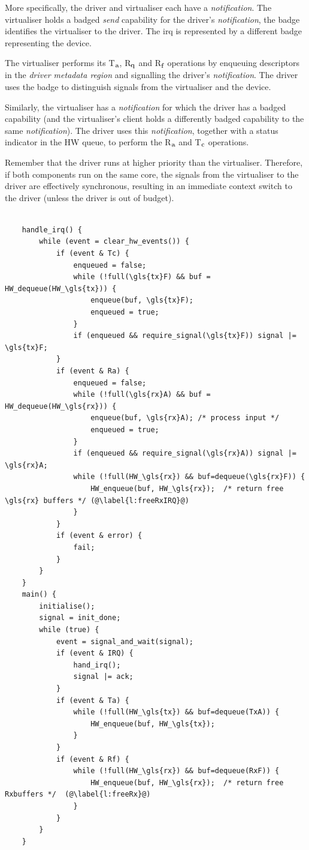 \documentclass[a4paper,12pt]{report}
\newcommand{\Obj}[1]{\textsl{#1}}
\newcommand{\Ra}{R\(_{\mbox{\footnotesize a}}\)\xspace}
\newcommand{\Tc}{T\(_{\mbox{\footnotesize c}}\)\xspace}
\newcommand{\Ta}{T\(_{\mbox{\footnotesize a}}\)\xspace}
\newcommand{\Rq}{R\(_{\mbox{\footnotesize q}}\)\xspace}
\newcommand{\Rf}{R\(_{\mbox{\footnotesize f}}\)\xspace}
\begin{document}
More specifically, the driver and virtualiser each have a \Obj{notification}. The
virtualiser holds a badged \Obj{send} capability for the driver's \Obj{notification},
the badge identifies the virtualiser to the driver. The \gls{irq} is represented
by a different badge representing the device.

The virtualiser performs its \Ta, \Rq and \Rf operations by enqueuing
descriptors in the \Obj{driver metadata region} and signalling the
driver's \Obj{notification}. The driver uses the badge to distinguish
signals from the virtualiser and the device.

Similarly, the virtualiser has a \Obj{notification} for which the driver has a
badged capability (and the virtualiser's client holds a differently
badged capability to the same \Obj{notification}). The driver uses this
\Obj{notification}, together with a status indicator in the HW queue, to
perform the \Ra and \Tc operations.

Remember that the driver runs at higher priority than the
virtualiser. Therefore, if both components run on the same core, the
signals from the virtualiser to the driver are effectively synchronous,
resulting in an immediate context switch to the driver (unless the
driver is out of budget).

\begin{lstlisting}[gobble=2,firstline=2,float,tabsize=2,
  label={f:eth_driver},
  caption={Ethernet driver pseudocode.}]

	handle_irq() {
		while (event = clear_hw_events()) {
			if (event & Tc) {
				enqueued = false;
				while (!full(\gls{tx}F) && buf = HW_dequeue(HW_\gls{tx})) {
					enqueue(buf, \gls{tx}F);
					enqueued = true;
				}
				if (enqueued && require_signal(\gls{tx}F)) signal |= \gls{tx}F;
			}
			if (event & Ra) {
				enqueued = false;
				while (!full(\gls{rx}A) && buf = HW_dequeue(HW_\gls{rx})) {
					enqueue(buf, \gls{rx}A); /* process input */
					enqueued = true;
				}
				if (enqueued && require_signal(\gls{rx}A)) signal |= \gls{rx}A;
				while (!full(HW_\gls{rx}) && buf=dequeue(\gls{rx}F)) {
					HW_enqueue(buf, HW_\gls{rx});  /* return free \gls{rx} buffers */ (@\label{l:freeRxIRQ}@)
				}
			}
			if (event & error) {
	      		fail;
			}
		}
	}
	main() {
		initialise();
		signal = init_done;
		while (true) {
			event = signal_and_wait(signal);
			if (event & IRQ) {
				hand_irq();
				signal |= ack;
			}
			if (event & Ta) {
				while (!full(HW_\gls{tx}) && buf=dequeue(TxA)) {
					HW_enqueue(buf, HW_\gls{tx});
				}
			}
			if (event & Rf) {
				while (!full(HW_\gls{rx}) && buf=dequeue(RxF)) {
					HW_enqueue(buf, HW_\gls{rx});  /* return free Rxbuffers */  (@\label{l:freeRx}@)
				}
			}
		}
	}
\end{lstlisting}
\end{document}
